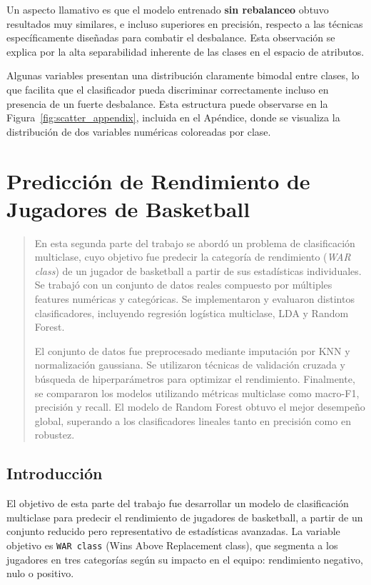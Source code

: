 \documentclass[11pt]{article}
\begin{document}
Un aspecto llamativo es que el modelo entrenado \textbf{sin rebalanceo} obtuvo resultados muy similares, e incluso superiores en precisión, respecto a las técnicas específicamente diseñadas para combatir el desbalance. Esta observación se explica por la alta separabilidad inherente de las clases en el espacio de atributos.

Algunas variables presentan una distribución claramente bimodal entre clases, lo que facilita que el clasificador pueda discriminar correctamente incluso en presencia de un fuerte desbalance. Esta estructura puede observarse en la Figura~\ref{fig:scatter_appendix}, incluida en el Apéndice, donde se visualiza la distribución de dos variables numéricas coloreadas por clase.





\section{Predicción de Rendimiento de Jugadores de Basketball}
\begin{abstract}
En esta segunda parte del trabajo se abordó un problema de clasificación multiclase, cuyo objetivo fue predecir la categoría de rendimiento (\textit{WAR class}) de un jugador de basketball a partir de sus estadísticas individuales. Se trabajó con un conjunto de datos reales compuesto por múltiples features numéricas y categóricas. Se implementaron y evaluaron distintos clasificadores, incluyendo regresión logística multiclase, LDA y Random Forest.

El conjunto de datos fue preprocesado mediante imputación por KNN y normalización gaussiana. Se utilizaron técnicas de validación cruzada y búsqueda de hiperparámetros para optimizar el rendimiento. Finalmente, se compararon los modelos utilizando métricas multiclase como macro-F1, precisión y recall. El modelo de Random Forest obtuvo el mejor desempeño global, superando a los clasificadores lineales tanto en precisión como en robustez.
\end{abstract}


\subsection{Introducción}

El objetivo de esta parte del trabajo fue desarrollar un modelo de clasificación multiclase para predecir el rendimiento de jugadores de basketball, a partir de un conjunto reducido pero representativo de estadísticas avanzadas. La variable objetivo es \texttt{WAR class} (Wins Above Replacement class), que segmenta a los jugadores en tres categorías según su impacto en el equipo: rendimiento negativo, nulo o positivo.
\end{document}
